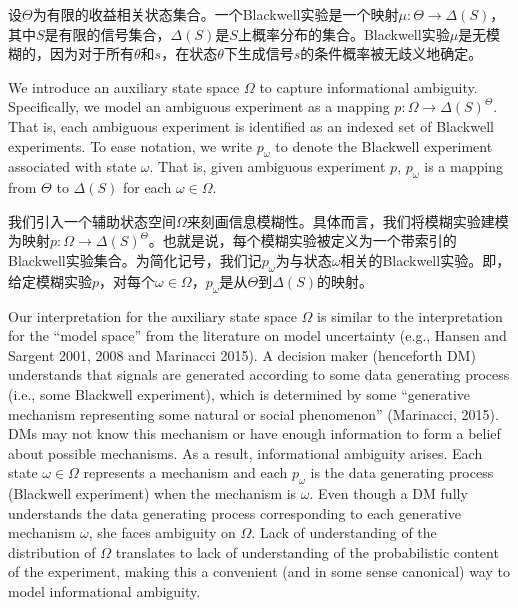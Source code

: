 \documentclass[12pt,a4paper]{article}
\newenvironment{original}
  {\par\vspace{4pt}\noindent\color{black}\ignorespaces}
  {\par\vspace{2pt}}
\newenvironment{translation}
  {\par\vspace{2pt}\noindent\color{myblue}\ignorespaces}
  {\par\vspace{6pt}}
\newcommand{\Delt}{\Delta}
\begin{document}
\begin{translation}
设$\Theta$为有限的收益相关状态集合。一个Blackwell实验是一个映射$\mu:\Theta\to\Delt(S)$，其中$S$是有限的信号集合，$\Delt(S)$是$S$上概率分布的集合。Blackwell实验$\mu$是无模糊的，因为对于所有$\theta$和$s$，在状态$\theta$下生成信号$s$的条件概率被无歧义地确定。
\end{translation}

\begin{original}
We introduce an auxiliary state space $\Omega$ to capture informational ambiguity. Specifically, we model an ambiguous experiment as a mapping $p:\Omega\to\Delt(S)^{\Theta}$. That is, each ambiguous experiment is identified as an indexed set of Blackwell experiments. To ease notation, we write $p_{\omega}$ to denote the Blackwell experiment associated with state $\omega$. That is, given ambiguous experiment $p$, $p_{\omega}$ is a mapping from $\Theta$ to $\Delt(S)$ for each $\omega\in\Omega$.
\end{original}

\begin{translation}
我们引入一个辅助状态空间$\Omega$来刻画信息模糊性。具体而言，我们将模糊实验建模为映射$p:\Omega\to\Delt(S)^{\Theta}$。也就是说，每个模糊实验被定义为一个带索引的Blackwell实验集合。为简化记号，我们记$p_{\omega}$为与状态$\omega$相关的Blackwell实验。即，给定模糊实验$p$，对每个$\omega\in\Omega$，$p_{\omega}$是从$\Theta$到$\Delt(S)$的映射。
\end{translation}

\begin{original}
Our interpretation for the auxiliary state space $\Omega$ is similar to the interpretation for the ``model space'' from the literature on model uncertainty (e.g., Hansen and Sargent 2001, 2008 and Marinacci 2015). A decision maker (henceforth DM) understands that signals are generated according to some data generating process (i.e., some Blackwell experiment), which is determined by some ``generative mechanism representing some natural or social phenomenon'' (Marinacci, 2015). DMs may not know this mechanism or have enough information to form a belief about possible mechanisms. As a result, informational ambiguity arises. Each state $\omega\in\Omega$ represents a mechanism and each $p_{\omega}$ is the data generating process (Blackwell experiment) when the mechanism is $\omega$. Even though a DM fully understands the data generating process corresponding to each generative mechanism $\omega$, she faces ambiguity on $\Omega$. Lack of understanding of the distribution of $\Omega$ translates to lack of understanding of the probabilistic content of the experiment, making this a convenient (and in some sense canonical) way to model informational ambiguity.
\end{original}
\end{document}
